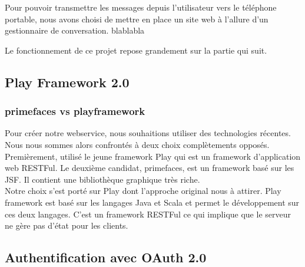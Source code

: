 Pour pouvoir transmettre les messages depuis l'utilisateur vers le téléphone portable, nous avons
choisi de mettre en place un site web à l'allure d'un gestionnaire de conversation. 
blablabla

Le fonctionnement de ce projet repose grandement sur la partie qui suit.
\\



\subsection{Play Framework 2.0}




\subsubsection{primefaces vs playframework}

Pour créer notre webservice, nous souhaitions utiliser des technologies récentes. Nous nous sommes
alors confrontés à deux choix complètements opposés. Premièrement, utilisé le jeune framework Play 
qui est un framework d'application web RESTFul. Le deuxième candidat, primefaces, est un framework
basé sur les JSF. Il contient une bibliothèque graphique très riche.
\\
Notre choix s'est porté sur Play dont l'approche original nous à attirer. Play framework est basé sur
les langages Java et Scala et permet le développement sur ces deux langages. C'est un framework RESTFul
ce qui implique que le serveur ne gère pas d'état pour les clients.
\\


\subsection{Authentification avec OAuth 2.0}

